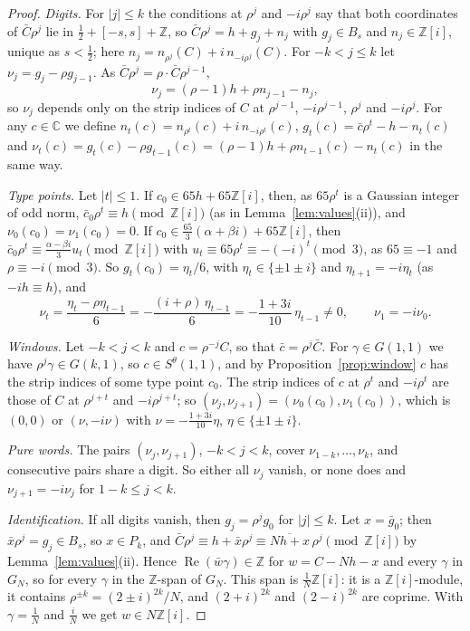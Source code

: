 \documentclass[11pt,a4paper]{amsart}
\theoremstyle{remark}
\newcommand{\Z}{\mathbb{Z}}
\newcommand{\C}{\mathbb{C}}
\begin{document}
\begin{proof}
\emph{Digits.} For $|j|\le k$ the conditions at $\rho^j$ and $-i\rho^j$ say that both coordinates of $\bar C\rho^j$
lie in $\frac12+[-s,s]+\Z$, so $\bar C\rho^j=h+g_j+n_j$ with $g_j\in B_s$ and $n_j\in\Z[i]$, unique as $s<\frac12$;
here $n_j=n_{\rho^j}(C)+i\,n_{-i\rho^j}(C)$. For $-k<j\le k$ let $\nu_j=g_j-\rho g_{j-1}$. As $\bar C\rho^j=\rho\cdot\bar
C\rho^{j-1}$,
\[
\nu_j=(\rho-1)h+\rho n_{j-1}-n_j,
\]
so $\nu_j$ depends only on the strip indices of $C$ at $\rho^{j-1}$, $-i\rho^{j-1}$, $\rho^j$ and $-i\rho^j$. For any
$c\in\C$ we define $n_t(c)=n_{\rho^t}(c)+i\,n_{-i\rho^t}(c)$, $g_t(c)=\bar c\rho^t-h-n_t(c)$ and
$\nu_t(c)=g_t(c)-\rho g_{t-1}(c)=(\rho-1)h+\rho n_{t-1}(c)-n_t(c)$ in the same way.

\emph{Type points.} Let $|t|\le1$. If $c_0\in65h+65\Z[i]$, then, as $65\rho^t$ is a Gaussian integer of odd norm,
$\bar c_0\rho^t\equiv h\pmod{\Z[i]}$ (as in Lemma~\ref{lem:values}(ii)), and $\nu_0(c_0)=\nu_1(c_0)=0$. If
$c_0\in\frac{65}3(\alpha+\beta i)+65\Z[i]$, then $\bar c_0\rho^t\equiv\frac{\alpha-\beta i}3u_t\pmod{\Z[i]}$ with
$u_t\equiv65\rho^t\equiv-(-i)^t\pmod3$, as $65\equiv-1$ and $\rho\equiv-i\pmod3$. So $g_t(c_0)=\eta_t/6$, with
$\eta_t\in\{\pm1\pm i\}$ and $\eta_{t+1}=-i\eta_t$ (as $-ih\equiv h$), and
\[
\nu_t=\frac{\eta_t-\rho\eta_{t-1}}6=-\frac{(i+\rho)\,\eta_{t-1}}6=-\frac{1+3i}{10}\,\eta_{t-1}\ne0,\qquad
\nu_1=-i\nu_0.
\]

\emph{Windows.} Let $-k<j<k$ and $c=\rho^{-j}C$, so that $\bar c=\rho^j\bar C$. For $\gamma\in G(1,1)$ we have
$\rho^j\gamma\in G(k,1)$, so $c\in S^\theta(1,1)$, and by Proposition~\ref{prop:window} $c$ has the strip indices
of some type point $c_0$. The strip indices of $c$ at $\rho^t$ and $-i\rho^t$ are those of $C$ at $\rho^{j+t}$ and
$-i\rho^{j+t}$; so $(\nu_j,\nu_{j+1})=(\nu_0(c_0),\nu_1(c_0))$, which is $(0,0)$ or $(\nu,-i\nu)$ with
$\nu=-\frac{1+3i}{10}\eta$, $\eta\in\{\pm1\pm i\}$.

\emph{Pure words.} The pairs $(\nu_j,\nu_{j+1})$, $-k<j<k$, cover $\nu_{1-k},\dots,\nu_k$, and consecutive pairs
share a digit. So either all $\nu_j$ vanish, or none does and $\nu_{j+1}=-i\nu_j$ for $1-k\le j<k$.

\emph{Identification.} If all digits vanish, then $g_j=\rho^jg_0$ for $|j|\le k$. Let $x=\bar g_0$; then $\bar
x\rho^j=g_j\in B_s$, so $x\in P_k$, and $\bar C\rho^j\equiv h+\bar x\rho^j\equiv\overline{Nh+x}\,\rho^j
\pmod{\Z[i]}$ by Lemma~\ref{lem:values}(ii). Hence $\operatorname{Re}(\bar w\gamma)\in\Z$ for $w=C-Nh-x$ and every
$\gamma$ in $G_N$, so for every $\gamma$ in the $\Z$-span of $G_N$. This span is $\frac1N\Z[i]$: it is a
$\Z[i]$-module, it contains $\rho^{\pm k}=(2\pm i)^{2k}/N$, and $(2+i)^{2k}$ and $(2-i)^{2k}$ are coprime. With
$\gamma=\frac1N$ and $\frac iN$ we get $w\in N\Z[i]$.


\end{proof}
\end{document}
